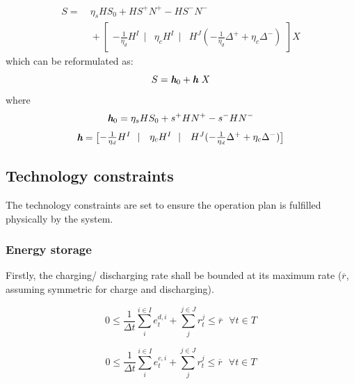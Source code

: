 \begin{equation}
\begin{aligned}
S = &~ \eta_s H S_0 + H S^+ N^+ - H S^- N^- \\
&~+ \begin{bmatrix}
-\frac{1}{\eta_d} H^I~~|& \eta_c H^I~~|& H^J (-\frac{1}{\eta_d} \Delta^{+} + \eta_c \Delta^{-})
\end{bmatrix} X
\end{aligned}
\end{equation}
which can be reformulated as:
\begin{equation}
\label{eq:state-EV-M-1}
S = \textit{\textbf{h}}_0 + \textit{\textbf{h}}~X
\end{equation}
where
\begin{equation}
\label{eq:state-EV-M-2}
\textit{\textbf{h}}_0 =  \eta_s H S_0 + s^+ H N^+ - s^- H N^-
\end{equation}
\begin{equation}
\label{eq:state-EV-M-3}
\textit{\textbf{h}} = \begin{bmatrix}
-\frac{1}{\eta_d} H^I~~|& \eta_c H^I~~|& H^J (-\frac{1}{\eta_d} \Delta^{+} + \eta_c \Delta^{-})
\end{bmatrix}
\end{equation}

\subsection{Technology constraints}
\label{sec:tech-constraints}
The technology constraints are set to ensure the operation plan is fulfilled physically by the system.

\subsubsection{Energy storage}
Firstly, the charging/ discharging rate shall be bounded at its maximum rate ($\overline{r}$, assuming symmetric for charge and discharging).

\begin{equation}
0 \leq \frac{1}{\Delta t}\sum_{i}^{i \in I} e^{d,i}_t + \sum_{j}^{j \in J} r_t^j \leq \overline{r}~~~ \forall t \in T
\end{equation}

\begin{equation}
0 \leq \frac{1}{\Delta t}\sum_{i}^{i \in I} e^{c,i}_t + \sum_{j}^{j \in J} r_t^j \leq \overline{r}~~~ \forall t \in T
\end{equation}

